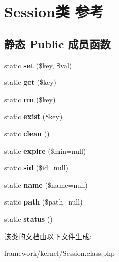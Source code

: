 \hypertarget{classSession}{\section{Session类 参考}
\label{classSession}
}
\subsection*{静态 Public 成员函数}
\begin{DoxyCompactItemize}
\item 
\hypertarget{classSession_a875e07190929d60a64e2bac59f33e33a}{static {\bfseries set} (\$key, \$val)}\label{classSession_a875e07190929d60a64e2bac59f33e33a}

\item 
\hypertarget{classSession_a555ab9c7731c0103b16baf165e34efe8}{static {\bfseries get} (\$key)}\label{classSession_a555ab9c7731c0103b16baf165e34efe8}

\item 
\hypertarget{classSession_a95c5924802a7a671d09e9c3582843938}{static {\bfseries rm} (\$key)}\label{classSession_a95c5924802a7a671d09e9c3582843938}

\item 
\hypertarget{classSession_afa763e91cf165dc4f0e64d2d7a383ecf}{static {\bfseries exist} (\$key)}\label{classSession_afa763e91cf165dc4f0e64d2d7a383ecf}

\item 
\hypertarget{classSession_a4cad41d7bac681f046e92396d59f1603}{static {\bfseries clean} ()}\label{classSession_a4cad41d7bac681f046e92396d59f1603}

\item 
\hypertarget{classSession_a68df91bf431785dd796086d26ce38699}{static {\bfseries expire} (\$min=null)}\label{classSession_a68df91bf431785dd796086d26ce38699}

\item 
\hypertarget{classSession_af336de5d253cd1e891f4c03a9fd614bb}{static {\bfseries sid} (\$id=null)}\label{classSession_af336de5d253cd1e891f4c03a9fd614bb}

\item 
\hypertarget{classSession_a5746f70fe1b29e72108d43d11b96bb90}{static {\bfseries name} (\$name=null)}\label{classSession_a5746f70fe1b29e72108d43d11b96bb90}

\item 
\hypertarget{classSession_a8a9ba8bdd531f9f5617d482705cc6d9e}{static {\bfseries path} (\$path=null)}\label{classSession_a8a9ba8bdd531f9f5617d482705cc6d9e}

\item 
\hypertarget{classSession_ac3f406fa774173d3fdc5df9e2ddd18ed}{static {\bfseries status} ()}\label{classSession_ac3f406fa774173d3fdc5df9e2ddd18ed}

\end{DoxyCompactItemize}


该类的文档由以下文件生成\+:\begin{DoxyCompactItemize}
\item 
framework/kernel/Session.\+class.\+php\end{DoxyCompactItemize}
